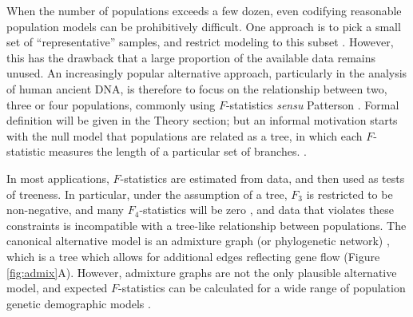 \documentclass[12pt,fullpage, a4paper]{article}
\begin{document}
When the number of populations exceeds a few dozen, even codifying reasonable population models can be prohibitively difficult. One approach is to pick a small set of ``representative'' samples, and restrict modeling to this subset \citep[e.g.][]{gravel2011, harney2021}. However, this has the drawback that a large proportion of the available data remains unused. An increasingly popular alternative approach, particularly in the analysis of human ancient DNA, is therefore to focus on the relationship between two, three or four populations, commonly using $F$-statistics \textit{sensu} Patterson \citep{reich2009, patterson2012, peter2016}. Formal definition will be given in the Theory section; but an informal motivation starts with the null model that populations are related as a tree, in which each $F$-statistic measures the length of a particular set of branches. \citep[Figure \ref{fig:geom};][]{semple2003, peter2016}.

In most applications, $F$-statistics are estimated from data, and then used as tests of treeness. In particular, under the assumption of a tree, $F_3$ is restricted to be non-negative, and many $F_4$-statistics will be zero \citep{semple2003, patterson2012}, and data that violates these constraints is incompatible with a tree-like relationship between populations. The canonical alternative model is an admixture graph (or phylogenetic network) \citep{patterson2012, huson2010}, which is a tree which allows for additional edges reflecting gene flow (Figure \ref{fig:admix}A). However, admixture graphs are not the only plausible alternative model, and expected $F$-statistics can be calculated for a wide range of population genetic demographic models \citep{peter2016}.
\end{document}
